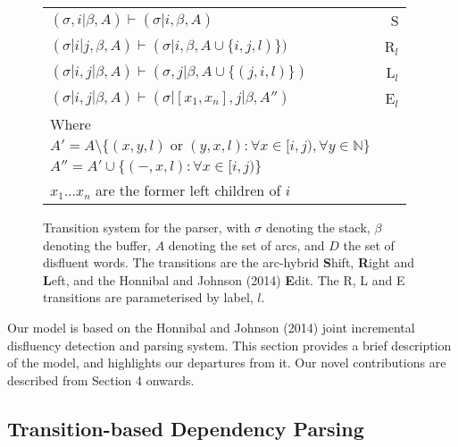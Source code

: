 \documentclass[11pt,letterpaper]{article}
\begin{document}
\begin{figure}
    \centering
    \small
    \begin{tabular}{lr}
        \hline
        $(\sigma, i | \beta, A) \vdash (\sigma | i, \beta, A)$ & S \\
        $(\sigma | i | j, \beta, A) \vdash (\sigma | i, \beta, A \cup \{i, j, l) \})$ & R$_l$ \\ 
        $(\sigma | i, j | \beta, A) \vdash (\sigma, j | \beta, A \cup \{(j, i, l)\})$ & L$_l$ \\
        $(\sigma | i, j | \beta, A) \vdash (\sigma | [x_1, x_n], j | \beta,A'')$ & E$_l$ \\
        Where \\
        $A' = A \setminus \{(x, y, l) \;\mathrm{or}\; (y, x, l) : \forall x \in [i, j), \forall y \in \mathbb{N} \}$ \\
            $A'' = A' \cup \{(-, x, l) : \forall x \in [i, j) \} $ \\
        $x_1...x_n$ are the former left children of $i$ \\
        \hline
\end{tabular}
\caption{\small Transition system for the parser, with $\sigma$ denoting the
    stack, $\beta$ denoting the buffer, $A$ denoting the set of arcs, and $D$ the
    set of disfluent words.  The transitions are the arc-hybrid \textbf{S}hift,
    \textbf{R}ight and \textbf{L}eft, and the Honnibal and Johnson (2014) \textbf{E}dit.
    The R, L and E transitions are parameterised by label, $l$.
\label{fig:trans}}
\vspace*{-3em}
\end{figure}
Our model is based on the Honnibal and Johnson (2014) joint incremental disfluency
detection and parsing system.  This section provides a brief description of
the model, and highlights our departures from it.
Our novel contributions are described from Section 4 onwards.
%

\subsection{Transition-based Dependency Parsing}
\end{document}
